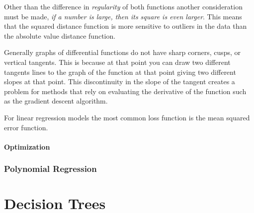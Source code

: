 \documentclass[12pt letter]{report}
\begin{document}
Other than the difference in \textit{regularity} of both functions another consideration must be made, \textit{if a
  number is large, then its square is even larger}. This means that the squared distance function is more sensitive to
outliers in the data than the absolute value distance function.


Generally graphs of differential functions do not have sharp corners, cusps, or vertical tangents. This is because at
that point you can draw two different tangents lines to the graph of the function at that point giving two different
slopes at that point. This discontinuity in the slope of the tangent creates a problem for methods that rely on
evaluating the derivative of the function such as the gradient descent algorithm.

For linear regression models the most common loss function is the mean squared error function.


\subsubsection{Optimization}

\subsection{Polynomial Regression}

\chapter{Decision Trees}
\end{document}
